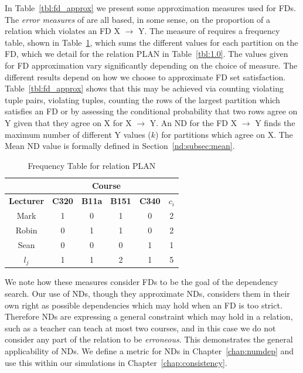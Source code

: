 In Table~\ref{tbl:fd_approx} we present some approximation measures
used for FDs. 
The {\em error measures} of 
\cite{km95}
are all based, in some sense, on the proportion of a relation which
violates an FD X $\to$ Y. The measure of \cite{psm93} requires a
frequency table, shown in Table~\ref{tab:fd_rel1}, which sums the
different values for each partition on the FD, which we detail for the
relation PLAN in Table~\ref{tbl:1.0}. The values given for FD
approximation vary significantly depending on the choice of measure. 
The different results depend on how we choose to approximate FD set
satisfaction. Table~\ref{tbl:fd_approx} shows that this may be
achieved via counting violating tuple pairs, violating tuples,
counting the rows of the largest partition which satisfies an FD or 
by assessing the conditional probability that two rows agree on Y
given that they agree on X for X $\to$ Y. An ND for the FD X $\to$ Y
finds the maximum 
number of different Y values ($k$) for partitions which agree on X. The Mean
ND value is formally defined in 
Section~\ref{nd:subsec:mean}. 


{\line
\begin{table}[ht]
\begin{center}
{\small
\begin{tabular}{||c|cccc|c||} \hline 
	& \multicolumn{4}{|c|}{\bf Course } &  \\ \hline
 {\bf Lecturer} & {\bf C320} & {\bf B11a} & {\bf B151} & {\bf C340} & $c_i$ \\ \hline
Mark		&	1    &	0 	  &	1 	&	0   & 2	\\
Robin		&	0    &	1 	  &	1 	&	0   & 2	\\
Sean		&	0    &	0 	  &	0 	&	1   & 1	\\ \hline
$l_j$		&    1	     &	1	  &	2	&	1   & 5	\\ \hline
\end{tabular}
}
\end{center}
\caption{\label{tab:fd_rel1}Frequency Table for relation PLAN}
\end{table}
}
 

We note how these measures consider FDs to be the goal of the
dependency search. Our use of NDs, though they approximate NDs,
considers them in their own right as possible dependencies which may
hold when an FD is too strict. Therefore NDs are expressing a general
constraint which may hold in a relation, such as a teacher can teach
at most two courses, and in this case we do not consider any part
of the relation to be {\em erroneous}. This demonstrates the general
applicability of NDs.
We define a metric for NDs in
 Chapter~\ref{chap:numdep} and use this within our simulations in
 Chapter~\ref{chap:consistency}. 

